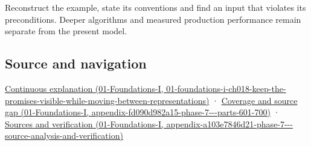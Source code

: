 Reconstruct the example, state its conventions and find an input that violates its preconditions. Deeper algorithms and measured production performance remain separate from the present model.

\subsection{Source and navigation}\label{appendix-175ca5ff874d-source-and-navigation}

\href{../01-Foundations-I/main.pdf\#nameddest=01-foundations-i-ch018-keep-the-promises-visible-while-moving-between-representations}{Continuous explanation (01-Foundations-I, 01-foundations-i-ch018-keep-the-promises-visible-while-moving-between-representations)} · \href{../01-Foundations-I/main.pdf\#nameddest=appendix-fd090d982a15-phase-7---parts-601-700}{Coverage and source gap (01-Foundations-I, appendix-fd090d982a15-phase-7-\/-\/-parts-601-700)} · \href{../01-Foundations-I/main.pdf\#nameddest=appendix-a103e7846d21-phase-7---source-analysis-and-verification}{Sources and verification (01-Foundations-I, appendix-a103e7846d21-phase-7-\/-\/-source-analysis-and-verification)}
